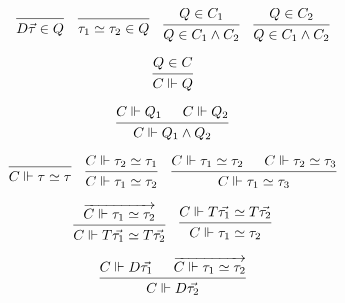 \documentclass[12pt]{article}
\begin{document}
\pagestyle{empty}

\[
    \begin{prooftree}
        \infer0{D \vec{\tau} \in Q}
    \end{prooftree}
    \hspace{1em}
    \begin{prooftree}
        \infer0{\tau_1 \simeq \tau_2 \in Q}
    \end{prooftree}
    \hspace{1em}
    \begin{prooftree}
        \hypo{Q \in C_1}
        \infer1{Q \in C_1 \land C_2}
    \end{prooftree}
    \hspace{1em}
    \begin{prooftree}
        \hypo{Q \in C_2}
        \infer1{Q \in C_1 \land C_2}
    \end{prooftree}
\]

\[
    \begin{prooftree}
        \hypo{Q \in C}
        \infer1{C \Vdash Q}
    \end{prooftree}
\]

\[
    \begin{prooftree}
        \hypo{C \Vdash Q_1}
        \hypo{C \Vdash Q_2}
        \infer2{C \Vdash Q_1 \land Q_2}
    \end{prooftree}
\]

\[
    \begin{prooftree}
        \infer0{C \Vdash \tau \simeq \tau}
    \end{prooftree}
    \hspace{1em}
    \begin{prooftree}
        \hypo{C \Vdash \tau_2 \simeq \tau_1}
        \infer1{C \Vdash \tau_1 \simeq \tau_2}
    \end{prooftree}
    \hspace{1em}
    \begin{prooftree}
        \hypo{C \Vdash \tau_1 \simeq \tau_2}
        \hypo{C \Vdash \tau_2 \simeq \tau_3}
        \infer2{C \Vdash \tau_1 \simeq \tau_3}
    \end{prooftree}
\]

\[
    \begin{prooftree}
        \hypo{\overrightarrow{C \Vdash \tau_1 \simeq \tau_2}}
        \infer1{C \Vdash T \vec{\tau_1} \simeq T \vec{\tau_2}}
    \end{prooftree}
    \hspace{1em}
    \begin{prooftree}
        \hypo{C \Vdash T \vec{\tau_1} \simeq T \vec{\tau_2}}
        \infer1{C \Vdash \tau_1 \simeq \tau_2}
    \end{prooftree}
\]

\[
    \begin{prooftree}
        \hypo{C \Vdash D \vec{\tau_1}}
        \hypo{\overrightarrow{C \Vdash \tau_1 \simeq \tau_2}}
        \infer2{C \Vdash D \vec{\tau_2}}
    \end{prooftree}
\]
\end{document}
